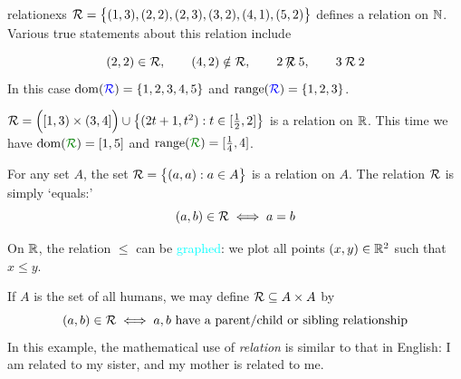 \begin{examples}{}{relationexs}
	\exstart $\mathcal{R}=\bigl\{(1,3),(2,2),(2,3),(3,2),(4,1),(5,2)\bigr\}$ defines a relation on $\mathbb{N}$. Various true statements about this relation include\par	
	\begin{enumerate}\setcounter{enumi}{1}
	  \begin{minipage}[t]{0.79\linewidth}\vspace{-18pt}
	  \item[]
	  \[
			(2,2)\in\mathcal{R},\qquad (4,2)\notin\mathcal{R},\qquad 2\mathbin{\not\!\!\mathcal{R}} 5,\qquad 3\mathbin{\mathcal{R}} 2
		\]
		In this case $\operatorname{dom}(\textcolor{blue}{\mathcal{R}})=\{1,2,3,4,5\}$ and $\operatorname{range}(\textcolor{blue}{\mathcal{R}})=\{1,2,3\}$.
		
		\item $\mathcal{R}=\Bigl([1,3)\times (3,4]\Bigr)\cup\bigl\{(2t+1,t^2):t\in [\frac 12,2]\bigr\}$ is a relation on $\mathbb{R}$. This time we have $\dom(\textcolor{Green}{\cR})=[1,5]$ and $\range(\textcolor{Green}{\cR})=[\frac 14,4]$.
	 
	 	\item\label{ex:relationexs3} For any set $A$, the set $\mathcal{R}=\bigl\{(a,a):a\in A\bigr\}$ is a relation on $A$. The relation $\mathcal{R}$ is simply `equals:'
		\[
			(a,b)\in \mathcal{R}\iff a=b
		\]		
		
		\item On $\mathbb{R}$, the relation $\le$ can be \textcolor{cyan}{graphed}: we plot all points $(x,y)\in\mathbb{R}^2$ such that $x\le y$.
		
		\item If $A$ is the set of all humans, we may define $\mathcal{R}\subseteq A\times A$ by
		\[
			(a,b)\in \mathcal{R}\iff a,b\text{ have a parent/child or sibling relationship}
		\]
		In this example, the mathematical use of \emph{relation} is similar to that in English: I am related to my sister, and my mother is related to me.
		

\end{minipage}
\end{enumerate}
\end{examples}
